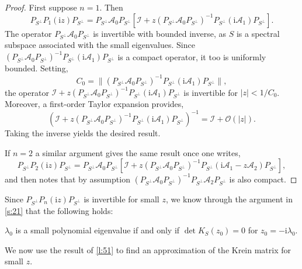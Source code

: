 \documentclass[review,onefignum,onetabnum]{siamart171218}
\def\det{\mathop\mathrm{det}\nolimits}
\newcommand{\rmi}{\mathrm{i}}
\newcommand{\calA}{\mathcal{A}}
\newcommand{\calI}{\mathcal{I}}
\newcommand{\calO}{\mathcal{O}}
\newcommand{\vK}{\bm{\mathit{K}}}
\newcommand{\vx}{\bm{\mathit{x}}}
\newcommand{\vn}{\bm{\mathit{0}}}
\begin{document}
\begin{proof}
First suppose $n=1$. Then
\[
P_{S^\perp}P_1(\rmi z)P_{S^\perp}=P_{S^\perp}\calA_0P_{S^\perp}
\left[\calI+z
\left(P_{S^\perp}\calA_0P_{S^\perp}\right)^{-1}P_{S^\perp}(\rmi\calA_1)P_{S^\perp}\right].
\]
The operator $P_{S^\perp}\calA_0P_{S^\perp}$ is invertible with bounded inverse, as $S$ is a spectral subspace associated with the small eigenvalues. Since $\left(P_{S^\perp}\calA_0P_{S^\perp}\right)^{-1}P_{S^\perp}(\rmi\calA_1)P_{S^\perp}$ is a compact operator, it too is uniformly bounded. Setting,
\[
C_0=\|\left(P_{S^\perp}\calA_0P_{S^\perp}\right)^{-1}P_{S^\perp}(\rmi\calA_1)P_{S^\perp}\|,
\]
the operator $\calI+z
\left(P_{S^\perp}\calA_0P_{S^\perp}\right)^{-1}P_{S^\perp}(\rmi\calA_1)P_{S^\perp}$ is invertible for $|z|<1/C_0$. Moreover, a first-order Taylor expansion provides,
\[
\left(\calI+z
\left(P_{S^\perp}\calA_0P_{S^\perp}\right)^{-1}P_{S^\perp}(\rmi\calA_1)P_{S^\perp}\right)^{-1}=\calI+\calO(|z|).
\]
Taking the inverse yields the desired result.

If $n=2$ a similar argument gives the same result once one writes,
\[
P_{S^\perp}P_2(\rmi z)P_{S^\perp}=P_{S^\perp}\calA_0P_{S^\perp}
\left[\calI+z
\left(P_{S^\perp}\calA_0P_{S^\perp}\right)^{-1}P_{S^\perp}\left(\rmi\calA_1-z\calA_2\right)P_{S^\perp}\right],
\]
and then notes that by assumption $\left(P_{S^\perp}\calA_0P_{S^\perp}\right)^{-1}P_{S^\perp}\calA_2P_{S^\perp}$ is also compact.
\end{proof}

Since $P_{S^\perp}P_n(\rmi z)P_{S^\perp}$ is invertible for small $z$, we know through the argument in \cref{s:21} that the following holds:

\begin{corollary}\label{cor:51}
$\lambda_0$ is a small polynomial eigenvalue if and only if $\det\vK_S(z_0)=0$ for $z_0=-\rmi\lambda_0$.
\end{corollary}


We now use the result of \cref{l:51} to find an approximation of the Krein matrix for small $z$.
\end{document}

